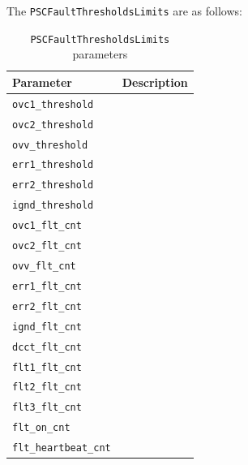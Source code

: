 \newpage
The \texttt{PSCFaultThresholdsLimits} are as follows:
\begin{table}[H]
	\centering
	\begin{tabular}{p{4cm}p{10cm}}
		\toprule
		\textbf{Parameter} & \textbf{Description} \\
		\midrule
		\texttt{ovc1\_threshold} &
		\\
		
		\texttt{ovc2\_threshold} &
		\\
		
		\texttt{ovv\_threshold} &
		\\
		
		\texttt{err1\_threshold} &
		\\
		
		\texttt{err2\_threshold} &
		\\
		
		\texttt{ignd\_threshold} &
		\\
		
		\texttt{ovc1\_flt\_cnt} &
		\\
		
		\texttt{ovc2\_flt\_cnt} &
		\\
		
		\texttt{ovv\_flt\_cnt} &
		\\
		
		\texttt{err1\_flt\_cnt} &
		\\
		
		\texttt{err2\_flt\_cnt} &
		\\
		
		\texttt{ignd\_flt\_cnt} &
		\\
		
		\texttt{dcct\_flt\_cnt} &
		\\
		
		\texttt{flt1\_flt\_cnt} &
		\\
		
		\texttt{flt2\_flt\_cnt} &
		\\
		
		\texttt{flt3\_flt\_cnt} &
		\\
		
		\texttt{flt\_on\_cnt} &
		\\
		
		\texttt{flt\_heartbeat\_cnt} &
		\\

		\bottomrule
	\end{tabular}
	\caption{\texttt{PSCFaultThresholdsLimits} parameters}
	\label{tab:fault-limits}
\end{table}

